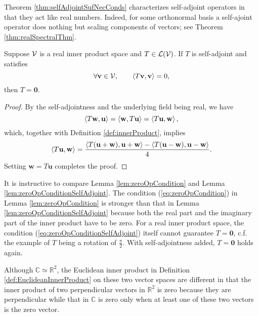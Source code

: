 \begin{rem}
  Theorem \ref{thm:selfAdjointSufNecConds} characterizes
  self-adjoint operators
  in that they act like real numbers.
  Indeed, for some orthonormal basis
  a self-ajoint operator does nothing
  but scaling components of vectors; 
  see Theorem \ref{thm:realSpectralThm}.
\end{rem}

\begin{lem}
  \label{lem:zeroOpConditionSelfAdjoint}
  Suppose ${\cal V}$ is a real inner product space
  and $T\in {\cal L}({\cal V})$.
  If $T$ is self-adjoint
  and satisfies
  \begin{equation}
    \label{eq:zeroOpConditionSelfAdjoint}
    \forall \mathbf{v}\in {\cal V},\qquad \left\langle T\mathbf{v},\mathbf{v} \right\rangle=0,
  \end{equation}
  then $T=\mathbf{0}$.
\end{lem}
\begin{proof}
  By the self-adjointness and the underlying field being real,
  we have
  \begin{displaymath}
    \left\langle T\mathbf{w},\mathbf{u} \right\rangle = \left\langle \mathbf{w},T\mathbf{u} \right\rangle = \left\langle T\mathbf{u},\mathbf{w} \right\rangle,
  \end{displaymath}
  which, together with Definition \ref{def:innerProduct},
  implies
  \begin{displaymath}
    \left\langle T\mathbf{u},\mathbf{w} \right\rangle = \frac{\left\langle T(\mathbf{u}+\mathbf{w}),\mathbf{u}+\mathbf{w} \right\rangle - \left\langle T(\mathbf{u}-\mathbf{w}),\mathbf{u}-\mathbf{w} \right\rangle}{4}.
  \end{displaymath}
  Setting $\mathbf{w}=T\mathbf{u}$ completes the proof.
\end{proof}

\begin{rem}
  It is instructive to compare
  Lemma \ref{lem:zeroOpCondition}
  and Lemma \ref{lem:zeroOpConditionSelfAdjoint}.
  The condition (\ref{eq:zeroOpCondition})
  in Lemma \ref{lem:zeroOpCondition}
  is stronger than that %
  in Lemma \ref{lem:zeroOpConditionSelfAdjoint}
  because both the real part
  and the imaginary part of the inner product
  have to be zero.
  For a real inner product space,
  the condition (\ref{eq:zeroOpConditionSelfAdjoint}) 
  itself cannot guarantee $T=\mathbf{0}$, 
  c.f. the example of $T$ being a rotation of $\frac{\pi}{2}$.
  With self-adjointness added, $T=\mathbf{0}$ holds again.

  Although $\mathbb{C}\simeq \mathbb{R}^2$,
  the Euclidean inner product in Definition
  \ref{def:EuclideanInnerProduct}
  on these two vector spaces are different in that
  the inner product of
  two perpendicular vectors in $\mathbb{R}^2$
  is zero because they are perpendicular
  while that in $\mathbb{C}$
  is zero only when at least one of these two vectors
  is the zero vector.
\end{rem}


